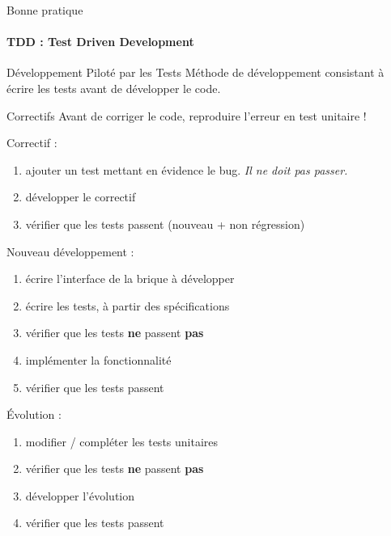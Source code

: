 \documentclass[compress]{beamer}%
\begin{document}
\begin{frame}{Bonne pratique}
	\framesubtitle{TDD : Test Driven Development}

	\begin{block}{Développement Piloté par les Tests}
		Méthode de développement consistant à écrire les tests avant de développer le code.
	\end{block}
	
	\pause
	\begin{alertblock}{Correctifs}
		Avant de corriger le code, reproduire l'erreur en test unitaire !
	\end{alertblock}
	
	\pause
	Correctif : 
	\begin{enumerate}[<+->]
		\item ajouter un test mettant en évidence le bug. \emph{Il ne doit pas passer.}
		\item développer le correctif
		\item vérifier que les tests passent (nouveau + non régression)
	\end{enumerate}
	
\end{frame}

\begin{frame}
	Nouveau développement : 
	\begin{enumerate}
		\item écrire l'interface de la brique à développer
		\item écrire les tests, à partir des spécifications
		\item vérifier que les tests \textbf{ne} passent \textbf{pas}
		\item implémenter la fonctionnalité
		\item vérifier que les tests passent
	\end{enumerate}
	

	\pause
	Évolution : 
	\begin{enumerate}
		\item modifier / compléter les tests unitaires
		\item vérifier que les tests \textbf{ne} passent \textbf{pas}
		\item développer l'évolution
		\item vérifier que les tests passent
	\end{enumerate}
	
\end{frame}


\end{document}
